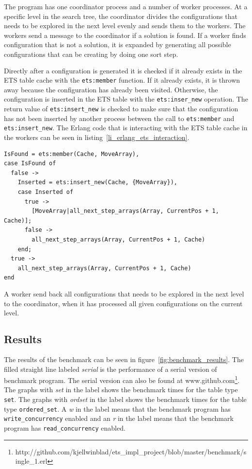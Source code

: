 \documentclass[aps,pre,preprint,nofootinbib]{revtex4}
\begin{document}
    The program has one coordinator process and a number of worker processes.
    At a specific level in the search tree, the coordinator divides the configurations that needs to be explored in the next level evenly and sends them to the workers.
    The workers send a message to the coordinator if a solution is found.
    If a worker finds configuration that is not a solution, it is expanded by generating all possible configurations that can be creating by doing one sort step.
    
    Directly after a configuration is generated it is checked if it already exists in the ETS table cache with the \verb|ets:member| function.
    If it already exists, it is thrown away because the configuration has already been visited.
    Otherwise, the configuration is inserted in the ETS table with the \verb|ets:inser_new| operation.
    The return value of \verb|ets:insert_new| is checked to make sure that the configuration has not been inserted by another process between the call to \verb|ets:member| and \verb|ets:insert_new|.
    The Erlang code that is interacting with the ETS table cache in the workers can be seen in listing~\ref{li_erlang_ets_interaction}.

    \lstset{language=erlang, caption=Worker code that is interacting with ETS, label=li_erlang_ets_interaction} 
\begin{lstlisting}[float=htb] 
IsFound = ets:member(Cache, MoveArray),
case IsFound of
  false ->
    Inserted = ets:insert_new(Cache, {MoveArray}),
    case Inserted of
      true ->
        [MoveArray|all_next_step_arrays(Array, CurrentPos + 1, Cache)];
      false ->
        all_next_step_arrays(Array, CurrentPos + 1, Cache)
    end;
  true ->
    all_next_step_arrays(Array, CurrentPos + 1, Cache)
end
\end{lstlisting}
    
    A worker send back all configurations that needs to be explored in the next level to the coordinator, when it has processed all given configurations on the current level.


\subsection{Results}

  The results of the benchmark can be seen in figure~\ref{fig:benchmark_results}.
  The filled straight line labeled \emph{serial} is the performance of a serial version of benchmark program.
  The serial version can also be found at www.github.com\footnote{http://github.com/kjellwinblad/ets\_impl\_project/blob/master/benchmark/single\_1.erl}.
  The graphs with \emph{set} in the label shows the benchmark times for the table type \verb|set|.
  The graphs with \emph{ordset} in the label shows the benchmark times for the table type \verb|ordered_set|.
  A \emph{w} in the label means that the benchmark program has \verb|write_concurrency| enabled and an \emph{r} in the label means that the benchmark program has \verb|read_concurrency| enabled.
  
\end{document}
